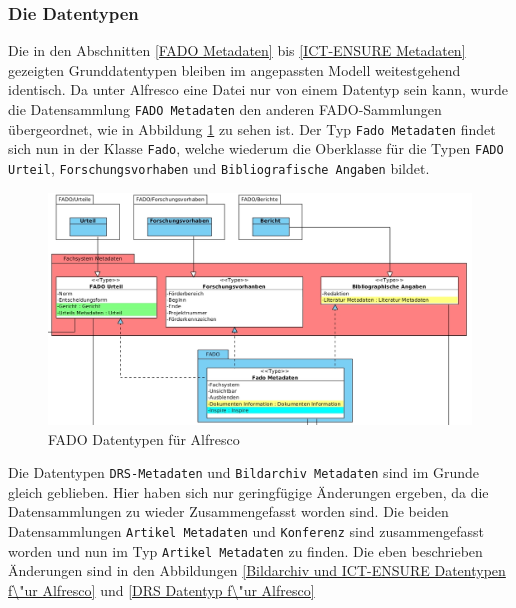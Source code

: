 \subsubsection{Die Datentypen}\label{Die Datentypen}
Die in den Abschnitten \ref{FADO Metadaten} bis \ref{ICT-ENSURE Metadaten} gezeigten Grunddatentypen bleiben im angepassten Modell weitestgehend identisch. Da unter Alfresco eine Datei nur von einem Datentyp sein kann, wurde die Datensammlung \texttt{FADO Metadaten} den anderen \ac{FADO}-Sammlungen \"ubergeordnet, wie in Abbildung \ref{Fado Datentypen f\"ur Alfresco} zu sehen ist. Der Typ \texttt{Fado Metadaten} findet sich nun in der Klasse \texttt{Fado}, welche wiederum die Oberklasse f\"ur die Typen \texttt{FADO Urteil}, \texttt{Forschungsvorhaben} und \texttt{Bibliografische Angaben} bildet.

\begin{figure}[!ht]
\centering
\includegraphics[width=16cm]{Bilder/AlfrescoModell/Fado-Datentypen.jpg}
\caption{FADO Datentypen f\"ur Alfresco}
\label{Fado Datentypen f\"ur Alfresco}
\centering
\end{figure}

Die Datentypen \texttt{DRS-Metadaten} und \texttt{Bildarchiv Metadaten} sind im Grunde gleich geblieben. Hier haben sich nur geringf\"ugige \"Anderungen ergeben, da die Datensammlungen zu wieder Zusammengefasst worden sind. Die beiden Datensammlungen \texttt{Artikel Metadaten} und \texttt{Konferenz} sind zusammengefasst worden und nun im Typ \texttt{Artikel Metadaten} zu finden.
Die eben beschrieben \"Anderungen sind in den Abbildungen \ref{Bildarchiv und ICT-ENSURE Datentypen f\"ur Alfresco} und \ref{DRS Datentyp f\"ur Alfresco}

